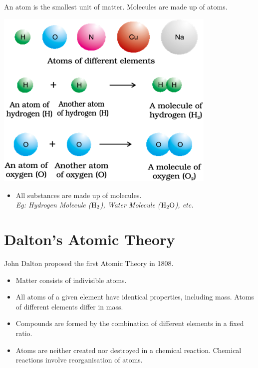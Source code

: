 \documentclass[
  14pt,
]{extarticle}
\providecommand{\tightlist}{%
  \setlength{\itemsep}{0pt}\setlength{\parskip}{0pt}}
\begin{document}
An atom is the smallest unit of matter. Molecules are made up of atoms.

\begin{center}\includegraphics[width=4.16667in,height=\textheight]{./images/2022-06-12-14-45-14.png}\end{center}

\begin{itemize}
\tightlist
\item
  All substances are made up of molecules.\\
  \emph{Eg: Hydrogen Molecule (\(\ce{H2}\)), Water Molecule
  (\(\ce{H2O}\)), etc.}
\end{itemize}

\hypertarget{daltons-atomic-theory}{%
\section{Dalton's Atomic Theory}\label{daltons-atomic-theory}}

John Dalton proposed the first Atomic Theory in 1808.

\begin{itemize}
\tightlist
\item
  Matter consists of indivisible atoms.
\item
  All atoms of a given element have identical properties, including
  mass. Atoms of different elements differ in mass.
\item
  Compounds are formed by the combination of different elements in a
  fixed ratio.
\item
  Atoms are neither created nor destroyed in a chemical reaction.
  Chemical reactions involve reorganisation of atoms.
\end{itemize}
\end{document}
